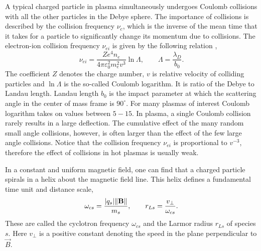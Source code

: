 A typical charged particle in plasma simultaneously undergoes Coulomb collisions with all the other particles in the Debye sphere. The importance of collisions is described by the collision frequency $ \nu_c $, which is the inverse of the mean time that it takes for a particle to significantly change its momentum due to collisions. The electron-ion collision frequency $ \nu_{ei} $ is given by the following relation \cite{nicholson},
\begin{equation}
\label{2.1.6}
\nu_{ei} = \frac{Z e^4 n_e}{4 \pi \varepsilon_0^2 m_e^2 v^3} \ln{\Lambda}, \qquad \Lambda = \frac{\lambda_D}{b_0}.
\end{equation}
The coefficient $ Z $ denotes the charge number, $ v $ is relative velocity of colliding particles and $ \ln \Lambda $ is the so-called Coulomb logarithm. It is ratio of the Debye to Landau length. Landau length $ b_0 $ is the impact parameter at which the scattering angle in the center of mass frame is $ 90^\circ $. For many plasmas of interest Coulomb logarithm takes on values between $ 5 - 15 $. In plasma, a single Coulomb collision rarely results in a large deflection. The cumulative effect of the many random small angle collisions, however, is often larger than the effect of the few large angle collisions. Notice that the collision frequency $ \nu_{ei} $ is proportional to $ v^{-3} $, therefore the effect of collisions in hot plasmas is usually weak.

In a constant and uniform magnetic field, one can find that a charged particle spirals in a helix about the magnetic field line. This helix defines a fundamental time unit and distance scale,
\begin{equation}
\label{2.1.7}
\omega_{cs} = \frac{\lvert q_{s}\rvert \lVert\mathbf{B}\rVert}{m_{s}}, \qquad r_{Ls} = \frac{v_\perp}{\omega_{cs}}.
\end{equation}
These are called the cyclotron frequency $ \omega_{cs} $ and the Larmor radius $ r_{Ls} $ of species $ s $. Here $ v_\perp $ is a positive constant denoting the speed in the plane perpendicular to $ \vec{B} $.
